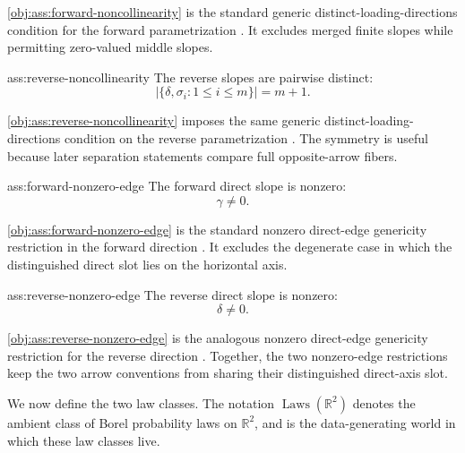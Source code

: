 \documentclass[11pt]{article}
\begin{document}
\cref{obj:ass:forward-noncollinearity} is the standard generic distinct-loading-directions condition for the forward parametrization \citep{SchkodaRobevaDrton2024}. It excludes merged finite slopes while permitting zero-valued middle slopes.

\begin{assumptionv}{ass:reverse-noncollinearity}
The reverse slopes are pairwise distinct:
\[
\left|\{\delta,\sigma_i:1\le i\le m\}\right|=m+1.
\]
\end{assumptionv}

\cref{obj:ass:reverse-noncollinearity} imposes the same generic distinct-loading-directions condition on the reverse parametrization \citep{SchkodaRobevaDrton2024}. The symmetry is useful because later separation statements compare full opposite-arrow fibers.

\begin{assumptionv}{ass:forward-nonzero-edge}
The forward direct slope is nonzero:
\[
\gamma\ne 0.
\]
\end{assumptionv}

\cref{obj:ass:forward-nonzero-edge} is the standard nonzero direct-edge genericity restriction in the forward direction \citep{ChenPengHuangEtAl2025Direction}. It excludes the degenerate case in which the distinguished direct slot lies on the horizontal axis.

\begin{assumptionv}{ass:reverse-nonzero-edge}
The reverse direct slope is nonzero:
\[
\delta\ne 0.
\]
\end{assumptionv}

\cref{obj:ass:reverse-nonzero-edge} is the analogous nonzero direct-edge genericity restriction for the reverse direction \citep{ChenPengHuangEtAl2025Direction}. Together, the two nonzero-edge restrictions keep the two arrow conventions from sharing their distinguished direct-axis slot.

We now define the two law classes. The notation \(\operatorname{Laws}(\mathbb R^2)\) denotes the ambient class of Borel probability laws on \(\mathbb R^2\), and  is the data-generating world in which these law classes live.
\end{document}
